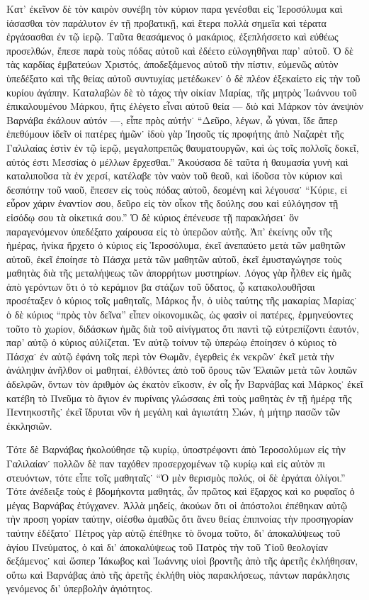 Κατ’ ἐκεῖνον δὲ τὸν καιρὸν συνέβη τὸν κύριον παρα%
γενέσθαι εἰς Ἱεροσόλυμα καὶ ἰάσασθαι τὸν παράλυτον
ἐν τῇ προβατικῇ, καὶ ἕτερα πολλὰ σημεῖα καὶ τέρατα
ἐργάσασθαι ἐν τῷ ἱερῷ. Ταῦτα θεασάμενος ὁ μακάριος,  
ἐξεπλήσσετο καὶ εὐθέως προσελθών, ἔπεσε παρὰ τοὺς
πόδας αὐτοῦ καὶ ἐδέετο εὐλογηθῆναι παρ’ αὐτοῦ. Ὁ δὲ
τὰς καρδίας ἐμβατεύων Χριστός, ἀποδεξάμενος αὐτοῦ τὴν
πίστιν, εὐμενῶς αὐτὸν ὑπεδέξατο καὶ τῆς θείας αὐτοῦ
συντυχίας μετέδωκεν˙ ὁ δὲ πλέον ἐξεκαίετο εἰς τὴν τοῦ
κυρίου ἀγάπην. Καταλαβὼν δὲ τὸ τάχος τὴν οἰκίαν
Μαρίας, τῆς μητρὸς Ἰωάννου τοῦ ἐπικαλουμένου Μάρκου,
ἥτις ἐλέγετο εἶναι αὐτοῦ θεία --- διὸ καὶ Μάρκον τὸν
ἀνεψιὸν Βαρνάβα ἐκάλουν αὐτόν ---, εἶπε πρὸς αὐτήν˙
\enquote{Δεῦρο, λέγων, ὦ γύναι, ἴδε ἅπερ ἐπεθύμουν ἰδεῖν οἱ
πατέρες ἡμῶν˙ ἰδοὺ γὰρ Ἰησοῦς τίς προφήτης ἀπὸ
Ναζαρὲτ τῆς Γαλιλαίας ἐστὶν ἐν τῷ ἱερῷ, μεγαλοπρεπῶς
θαυματουργῶν, καὶ ὡς τοῖς πολλοῖς δοκεῖ, αὐτός ἐστι
Μεσσίας ὁ μέλλων ἔρχεσθαι.} Ἀκούσασα δὲ ταῦτα ἡ
θαυμασία γυνὴ καὶ καταλιποῦσα τὰ ἐν χερσί, κατέλαβε
τὸν ναὸν τοῦ θεοῦ, καὶ ἰδοῦσα τὸν κύριον καὶ δεσπότην
τοῦ ναοῦ, ἔπεσεν εἰς τοὺς πόδας αὐτοῦ, δεομένη καὶ
λέγουσα˙ \enquote{Κύριε, εἰ εὖρον χάριν ἐναντίον σου, δεῦρο
εἰς τὸν οἶκον τῆς δούλης σου καὶ εὐλόγησον τῇ εἰσόδῳ
σου τὰ οἰκετικά σου.} Ὁ δὲ κύριος ἐπένευσε τῇ
παρακλήσει˙ ὃν παραγενόμενον ὑπεδέξατο χαίρουσα εἰς
τὸ ὑπερῶον αὐτῆς. Ἀπ’ ἐκείνης οὖν τῆς ἡμέρας, ἡνίκα
ἤρχετο ὁ κύριος εἰς Ἱεροσόλυμα, ἐκεῖ ἀνεπαύετο μετὰ
τῶν μαθητῶν αὐτοῦ, ἐκεῖ ἐποίησε τὸ Πάσχα μετὰ τῶν
μαθητῶν αὐτοῦ, ἐκεῖ ἐμυσταγώγησε τοὺς μαθητὰς διὰ
τῆς μεταλήψεως τῶν ἀπορρήτων μυστηρίων. Λόγος γὰρ
ἦλθεν εἰς ἡμᾶς ἀπὸ γερόντων ὅτι ὁ τὸ κεράμιον βα%
στάζων τοῦ ὕδατος, ᾧ κατακολουθῆσαι προσέταξεν ὁ
κύριος τοῖς μαθηταῖς, Μάρκος ἦν, ὁ υἱὸς ταύτης τῆς
μακαρίας Μαρίας˙ ὁ δὲ κύριος \enquote{πρὸς τὸν δεῖνα} εἶπεν
οἰκονομικῶς, ὡς φασὶν οἱ πατέρες, ἑρμηνεύοντες τοῦτο
τὸ χωρίον, διδάσκων ἡμᾶς διὰ τοῦ αἰνίγματος ὅτι παντὶ
τῷ εὐτρεπίζοντι ἑαυτόν, παρ’ αὐτῷ ὁ κύριος αὐλίζεται.
Ἐν αὐτῷ τοίνυν τῷ ὑπερώῳ ἐποίησεν ὁ κύριος τὸ
Πάσχα˙ ἐν αὐτῷ ἐφάνη τοῖς περὶ τὸν Θωμᾶν, ἐγερθεὶς
ἐκ νεκρῶν˙ ἐκεῖ μετὰ τὴν ἀνάληψιν ἀνῆλθον οἱ μαθηταί,
ἐλθόντες ἀπὸ τοῦ ὄρους τῶν Ἐλαιῶν μετὰ τῶν λοιπῶν
ἀδελφῶν, ὄντων τὸν ἀριθμὸν ὡς ἐκατὸν εἴκοσιν, ἐν οἷς
ἦν Βαρνάβας καὶ Μάρκος˙ ἐκεῖ κατέβη τὸ Πνεῦμα τὸ
ἅγιον ἐν πυρίναις γλώσσαις ἐπὶ τοὺς μαθητὰς ἐν τῇ
ἡμέρᾳ τῆς Πεντηκοστῆς˙ ἐκεῖ ἵδρυται νῦν ἡ μεγάλη καὶ
ἁγιωτάτη Σιών, ἡ μήτηρ πασῶν τῶν ἐκκλησιῶν.

Τότε δὲ Βαρνάβας ἠκολούθησε τῷ κυρίῳ, ὑποστρέφοντι
ἀπὸ Ἱεροσολύμων εἰς τὴν Γαλιλαίαν˙ πολλῶν δὲ παν%
ταχόθεν προσερχομένων τῷ κυρίῳ καὶ εἰς αὐτὸν πι%
στευόντων, τότε εἶπε τοῖς μαθηταῖς˙ \enquote{Ὁ μὲν θερισμὸς
πολύς, οἱ δὲ ἐργάται ὀλίγοι.} Τότε ἀνέδειξε τοὺς ἑ%
βδομήκοντα μαθητάς, ὧν πρῶτος καὶ ἔξαρχος καὶ κο%
ρυφαῖος ὁ μέγας Βαρνάβας ἐτύγχανεν. Ἀλλὰ μηδείς,
ἀκούων ὅτι οἱ ἀπόστολοι ἐπέθηκαν αὐτῷ τὴν προση%
γορίαν ταύτην, οἰέσθω ἀμαθῶς ὅτι ἄνευ θείας ἐπιπνοίας
τὴν προσηγορίαν ταύτην ἐδέξατο˙ Πέτρος γὰρ αὐτῷ
ἐπέθηκε τὸ ὄνομα τοῦτο, δι’ ἀποκαλύψεως τοῦ ἁγίου
Πνεύματος, ὁ καὶ δι’ ἀποκαλύψεως τοῦ Πατρὸς τὴν τοῦ
Υἱοῦ θεολογίαν δεξάμενος˙ καὶ ὥσπερ Ἰάκωβος καὶ
Ἰωάννης υἱοὶ βροντῆς ἀπὸ τῆς ἀρετῆς ἐκλήθησαν, οὕτω
καὶ Βαρνάβας ἀπὸ τῆς ἀρετῆς ἐκλήθη υἱὸς παρακλήσεως,
πάντων παράκλησις γενόμενος δι’ ὑπερβολὴν ἁγιότητος.

